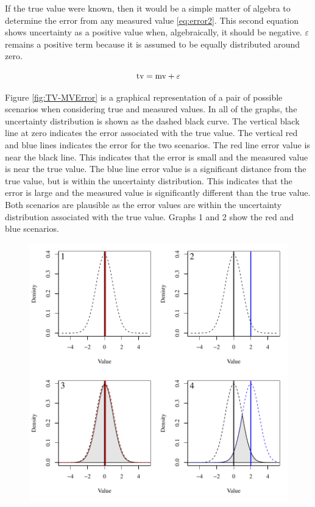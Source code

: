 \begin{linenumbers}
If the true value were known, then it would be a simple matter of algebra to determine the error from any measured value \ref{eq:error2}.  This second equation shows uncertainty as a positive value when, algebraically, it should be negative.  $ \varepsilon $ remains a positive term because it is assumed to be equally distributed around zero.

\begin{equation}
\label{eq:error2}
\textnormal{tv} = \textnormal{mv} + \varepsilon
\end{equation}

Figure \ref{fig:TV-MVError} is a graphical representation of a pair of possible scenarios when considering true and measured values.  In all of the graphs, the uncertainty distribution is shown as the dashed black curve.  The vertical black line at zero indicates the error associated with the true value.  The vertical red and blue lines indicates the error for the two scenarios.  The red line error value is near the black line.  This indicates that the error is small and the measured value is near the true value.  The blue line error value is a significant distance from the true value, but is within the uncertainty distribution.  This indicates that the error is large and the measured value is significantly different than the true value.  Both scenarios are plausible as the error values are within the uncertainty distribution associated with the true value.  Graphs 1 and 2 show the red and blue scenarios.
\begin{figure}[htbp]
\begin{center}
	\includegraphics[width=6in]{"Figures/TV-MV Error"}

\end{center}
\end{figure}
\end{linenumbers}
